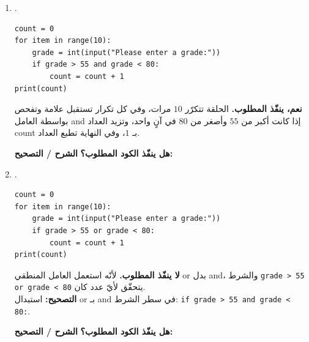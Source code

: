 \documentclass[14pt]{extarticle}
\begin{document}
\begin{enumerate}[label=\textbf{السؤال \arabic*:}, wide=0pt, itemsep=2.2em]
\begin{enumerate}[label=\textbf{مقطع \alph*:}, wide=0pt, itemsep=1.5em]

\item .
\begin{boxCode}
\begin{english}
\begin{verbatim}
count = 0
for item in range(10):
    grade = int(input("Please enter a grade:"))
    if grade > 55 and grade < 80:
        count = count + 1
print(count)
\end{verbatim}
\end{english}
\end{boxCode}
\ifwithsols
\begin{boxSolution}
\textbf{نعم، ينفّذ المطلوب.} الحلقة تتكرّر $10$ مرات، وفي كل تكرار تستقبل علامة وتفحص بواسطة العامل \textenglish{and} إذا كانت أكبر من $55$ وأصغر من $80$ في آنٍ واحد، وتزيد العداد \textenglish{count} بـ $1$، وفي النهاية تطبع العداد.
\end{boxSolution}
\else
\textbf{هل ينفّذ الكود المطلوب؟} \underline{\hspace{4cm}} \quad \textbf{الشرح / التصحيح:} \underline{\hspace{6cm}}
\fi
\filbreak

\item .
\begin{boxCode}
\begin{english}
\begin{verbatim}
count = 0
for item in range(10):
    grade = int(input("Please enter a grade:"))
    if grade > 55 or grade < 80:
        count = count + 1
print(count)
\end{verbatim}
\end{english}
\end{boxCode}
\ifwithsols
\begin{boxSolution}
\textbf{لا ينفّذ المطلوب.} لأنّه استعمل العامل المنطقي \textenglish{or} بدل \textenglish{and}، والشرط \textenglish{\texttt{grade > 55 or grade < 80}} يتحقّق لأيّ عدد كان. \\
\textbf{التصحيح:} استبدال \textenglish{or} بـ \textenglish{and} في سطر الشرط: \textenglish{\texttt{if grade > 55 and grade < 80:}}.
\end{boxSolution}
\else
\textbf{هل ينفّذ الكود المطلوب؟} \underline{\hspace{4cm}} \quad \textbf{الشرح / التصحيح:} \underline{\hspace{6cm}}
\fi
\filbreak


\end{enumerate}
\end{enumerate}
\end{document}
